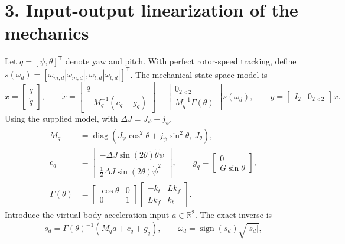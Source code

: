 \section*{3. Input-output linearization of the mechanics}
Let $q=[\psi,\theta]^\mathsf{T}$ denote yaw and pitch. With perfect rotor-speed tracking, define $s(\omega_d)=[\omega_{m,d}|\omega_{m,d}|,\omega_{t,d}|\omega_{t,d}|]^\mathsf{T}$. The mechanical state-space model is
\begin{equation}
x=\begin{bmatrix}q\\\dot q\end{bmatrix},\qquad
\boxed{\dot x=
\begin{bmatrix}\dot q\\-M_q^{-1}(c_q+g_q)\end{bmatrix}
+\begin{bmatrix}0_{2\times2}\\M_q^{-1}\Gamma(\theta)\end{bmatrix}s(\omega_d)},\qquad
y=\begin{bmatrix}I_2&0_{2\times2}\end{bmatrix}x.
\end{equation}
Using the supplied model, with $\Delta J=J_\psi-j_\psi$,
\begin{equation}
\begin{aligned}
M_q&=\operatorname{diag}(J_\psi\cos^2\theta+j_\psi\sin^2\theta,\ J_\theta),\\
c_q&=\begin{bmatrix}-\Delta J\sin(2\theta)\dot\theta\dot\psi\\
\tfrac12\Delta J\sin(2\theta)\dot\psi^2\end{bmatrix},\qquad
g_q=\begin{bmatrix}0\\G\sin\theta\end{bmatrix},\\
\Gamma(\theta)&=\begin{bmatrix}\cos\theta&0\\0&1\end{bmatrix}
\begin{bmatrix}-k_t&Lk_f\\Lk_f&k_t\end{bmatrix}.
\end{aligned}
\end{equation}
Introduce the virtual body-acceleration input $a\in\mathbb R^2$. The exact inverse is
\begin{equation}
\boxed{s_d=\Gamma(\theta)^{-1}(M_qa+c_q+g_q),\qquad
\omega_d=\operatorname{sign}(s_d)\sqrt{|s_d|},}
\end{equation}
